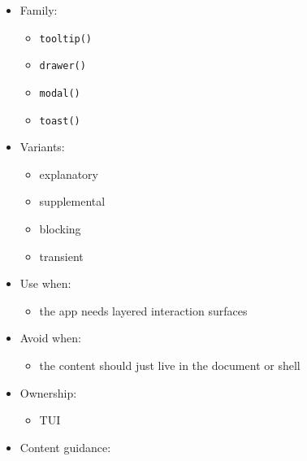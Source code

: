 \begin{itemize}
\tightlist
\item
  Family:

  \begin{itemize}
  \tightlist
  \item
    \texttt{t\allowbreak{}o\allowbreak{}o\allowbreak{}l\allowbreak{}t\allowbreak{}i\allowbreak{}p\allowbreak{}(\allowbreak{})}
  \item
    \texttt{d\allowbreak{}r\allowbreak{}a\allowbreak{}w\allowbreak{}e\allowbreak{}r\allowbreak{}(\allowbreak{})}
  \item
    \texttt{m\allowbreak{}o\allowbreak{}d\allowbreak{}a\allowbreak{}l\allowbreak{}(\allowbreak{})}
  \item
    \texttt{t\allowbreak{}o\allowbreak{}a\allowbreak{}s\allowbreak{}t\allowbreak{}(\allowbreak{})}
  \end{itemize}
\item
  Variants:

  \begin{itemize}
  \tightlist
  \item
    explanatory
  \item
    supplemental
  \item
    blocking
  \item
    transient
  \end{itemize}
\item
  Use when:

  \begin{itemize}
  \tightlist
  \item
    the app needs layered interaction surfaces
  \end{itemize}
\item
  Avoid when:

  \begin{itemize}
  \tightlist
  \item
    the content should just live in the document or shell
  \end{itemize}
\item
  Ownership:

  \begin{itemize}
  \tightlist
  \item
    TUI
  \end{itemize}
\item
  Content guidance:


\end{itemize}
